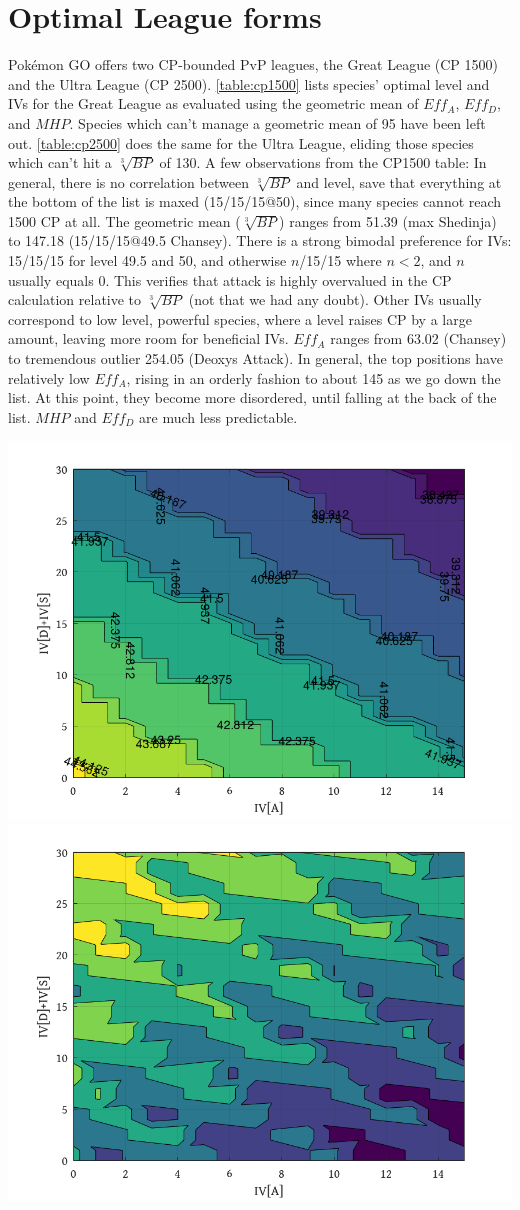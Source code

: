 \section{Optimal League forms}
Pokémon GO offers two CP-bounded PvP leagues, the Great League (CP 1500) and
   the Ultra League (CP 2500).
\autoref{table:cp1500} lists species' optimal level and IVs for the Great League
  as evaluated using the geometric mean of $Eff_A$, $Eff_D$, and $MHP$.
Species which can't manage a geometric mean of 95 have been left out.
\autoref{table:cp2500} does the same for the Ultra League, eliding those species which
  can't hit a $\sqrt[3]{BP}$ of 130.
A few observations from the CP1500 table:
In general, there is no correlation between $\sqrt[3]{BP}$ and level,
  save that everything at the bottom of the list is maxed (15/15/15@50),
  since many species cannot reach 1500 CP at all.
The geometric mean ($\sqrt[3]{BP}$) ranges from 51.39 (max Shedinja)
  to 147.18 (15/15/15@49.5 Chansey).
There is a strong bimodal preference for IVs: 15/15/15 for level 49.5
  and 50, and otherwise $n$/15/15 where $n < 2$, and $n$ usually equals 0.
This verifies that attack is highly overvalued in the CP calculation
  relative to $\sqrt[3]{BP}$ (not that we had any doubt).
Other IVs usually correspond to low level, powerful species, where a level
  raises CP by a large amount, leaving more room for beneficial IVs.
$Eff_A$ ranges from 63.02 (Chansey) to tremendous outlier 254.05 (Deoxys Attack).
In general, the top positions have relatively low $Eff_A$, rising in an
  orderly fashion to about 145 as we go down the list.
At this point, they become more disordered, until falling at the back
  of the list.
$MHP$ and $Eff_D$ are much less predictable.

\includegraphics[width=.5\textwidth,keepaspectratio]{octave/greninjalevels.png}
\includegraphics[width=.5\textwidth,keepaspectratio]{octave/greninjagmeans.png}


